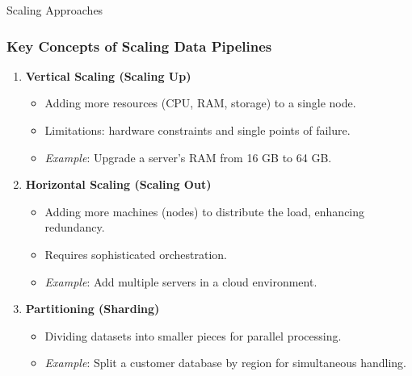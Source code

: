 \documentclass[aspectratio=169]{beamer}
\begin{document}
\begin{frame}[fragile]{Scaling Approaches}
    \frametitle{Key Concepts of Scaling Data Pipelines}
    \begin{enumerate}
        \item \textbf{Vertical Scaling (Scaling Up)} 
        \begin{itemize}
            \item Adding more resources (CPU, RAM, storage) to a single node.
            \item Limitations: hardware constraints and single points of failure.
            \item \textit{Example}: Upgrade a server's RAM from 16 GB to 64 GB.
        \end{itemize}
        
        \item \textbf{Horizontal Scaling (Scaling Out)} 
        \begin{itemize}
            \item Adding more machines (nodes) to distribute the load, enhancing redundancy.
            \item Requires sophisticated orchestration.
            \item \textit{Example}: Add multiple servers in a cloud environment.
        \end{itemize}

        \item \textbf{Partitioning (Sharding)} 
        \begin{itemize}
            \item Dividing datasets into smaller pieces for parallel processing.
            \item \textit{Example}: Split a customer database by region for simultaneous handling.
        \end{itemize}
    \end{enumerate}
\end{frame}
\end{document}
